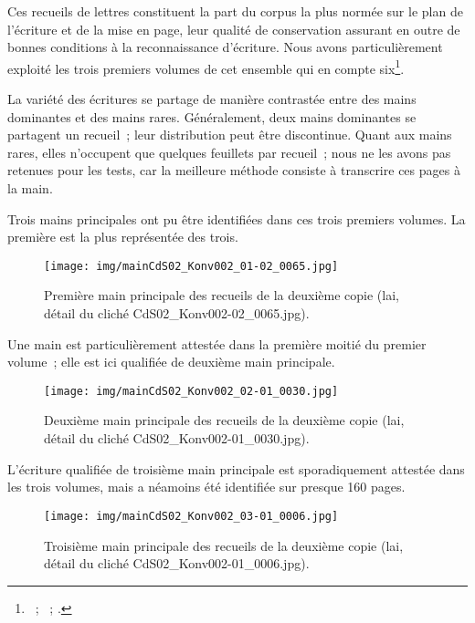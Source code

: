 \documentclass[a4paper,12pt,twoside]{book}
\begin{document}
				Ces recueils de lettres constituent la part du corpus la plus normée sur le plan de l'écriture et de la mise en page, leur qualité de conservation assurant en outre de bonnes conditions à la reconnaissance d'écriture. Nous avons particulièrement exploité les trois premiers volumes de cet ensemble qui en compte six\footnote{\cite{CdS02001330}~; \cite{CdS02001369}~; \cite{CdS02001334}.}.
				
				La variété des écritures se partage de manière contrastée entre des mains dominantes et des mains rares. Généralement, deux mains dominantes se partagent un recueil~; leur distribution peut être discontinue. Quant aux mains rares, elles n'occupent que quelques feuillets par recueil~; nous ne les avons pas retenues pour les tests, car la meilleure méthode consiste à transcrire ces pages à la main.
				
				Trois mains principales ont pu être identifiées dans ces trois premiers volumes. La première est la plus représentée des trois.
				
				\begin{figure}[!h]
					\centering
					\texttt{[image: img/mainCdS02\_Konv002\_01-02\_0065.jpg]}
					\caption{Première main principale des recueils de la deuxième copie (\gls{lai}, détail du cliché CdS02\_Konv002-02\_0065.jpg).}
					\label{}
				\end{figure}
			
				Une main est particulièrement attestée dans la première moitié du premier volume~; elle est ici qualifiée de \og deuxième main principale\fg.
				
				\begin{figure}[!h]
					\centering
					\texttt{[image: img/mainCdS02\_Konv002\_02-01\_0030.jpg]}
					\caption{Deuxième main principale des recueils de la deuxième copie (\gls{lai}, détail du cliché CdS02\_Konv002-01\_0030.jpg).}
					\label{}
				\end{figure}
			
				L'écriture qualifiée de \og troisième main principale \fg est sporadiquement attestée dans les trois volumes, mais a néamoins été identifiée sur presque 160 pages.
			
				\begin{figure}[!h]
					\centering
					\texttt{[image: img/mainCdS02\_Konv002\_03-01\_0006.jpg]}
					\caption{Troisième main principale des recueils de la deuxième copie  (\gls{lai}, détail du cliché CdS02\_Konv002-01\_0006.jpg).}
					\label{}
				\end{figure}
					
\end{document}
